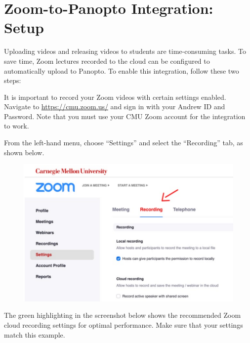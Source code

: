 \section{Zoom-to-Panopto Integration: Setup}
\label{sec:panopto:zoom_to_panopto_integration_set_up}

Uploading videos and releasing videos to students are time-consuming tasks. To save time, Zoom lectures recorded to the cloud can be configured to automatically upload to Panopto. To enable this integration, follow these two steps:

\begin{gram}[Step 1/2]
	It is important to record your Zoom videos with certain settings enabled. Navigate to \href{https://cmu.zoom.us/}{https://cmu.zoom.us/} and sign in with your Andrew ID and Password. Note that you must use your CMU Zoom account for the integration to work.

	From the left-hand menu, choose ``Settings'' and select the ``Recording'' tab, as shown below.

	\begin{figure}[H]
		\centering
		\includegraphics[scale=0.7]{panopto/media/03-recording.png}
	\end{figure}

	The green highlighting in the screenshot below shows the recommended Zoom cloud recording settings for optimal performance. Make sure that your settings match this example.


\end{gram}
